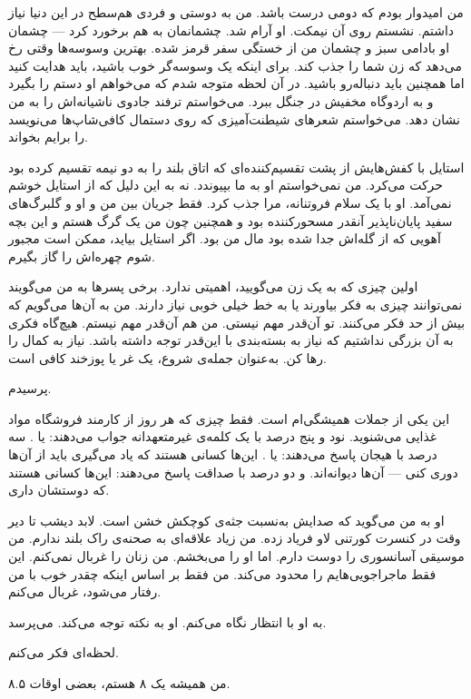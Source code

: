 \begin{flushleft}
من امیدوار بودم که دومی درست باشد. من به دوستی و فردی هم‌سطح در این دنیا نیاز داشتم. نشستم روی آن نیمکت. او آرام شد. چشمانمان به هم برخورد کرد — چشمان او بادامی سبز و چشمان من از خستگی سفر قرمز شده. بهترین وسوسه‌ها وقتی رخ می‌دهد که زن شما را جذب کند. برای اینکه یک وسوسه‌گر خوب باشید، باید هدایت کنید اما همچنین باید دنباله‌رو باشید. در آن لحظه متوجه شدم که می‌خواهم او دستم را بگیرد و به اردوگاه مخفیش در جنگل ببرد. می‌خواستم ترفند جادوی ناشیانه‌اش را به من نشان دهد. می‌خواستم شعرهای شیطنت‌آمیزی که روی دستمال کافی‌شاپ‌ها می‌نویسد را برایم بخواند.


استایل با کفش‌هایش از پشت تقسیم‌کننده‌ای که اتاق بلند را به دو نیمه تقسیم کرده بود حرکت می‌کرد. من نمی‌خواستم او به ما بپیوندد. نه به این دلیل که از استایل خوشم نمی‌آمد. او با یک سلام فروتنانه،  مرا جذب کرد. فقط جریان بین من و او و گلبرگ‌های سفید پایان‌ناپذیر آنقدر مسحورکننده بود و همچنین چون من یک گرگ هستم و این بچه آهویی که از گله‌اش جدا شده بود مال من بود. اگر استایل بیاید، ممکن است مجبور شوم چهره‌اش را گاز بگیرم.

اولین چیزی که به یک زن می‌گویید، اهمیتی ندارد. برخی پسرها به من می‌گویند نمی‌توانند چیزی به فکر بیاورند یا به خط خیلی خوبی نیاز دارند. من به آن‌ها می‌گویم که بیش از حد فکر می‌کنند. تو آن‌قدر مهم نیستی. من هم آن‌قدر مهم نیستم. هیچ‌گاه فکری به آن بزرگی نداشتیم که نیاز به بسته‌بندی با این‌قدر توجه داشته باشد. نیاز به کمال را رها کن. به‌عنوان جمله‌ی شروع، یک غر یا پوزخند کافی است.

 پرسیدم.

این یکی از جملات همیشگی‌ام است. فقط چیزی که هر روز از کارمند فروشگاه مواد غذایی می‌شنوید. نود و پنج درصد با یک کلمه‌ی غیرمتعهدانه جواب می‌دهند:  یا . سه درصد با هیجان پاسخ می‌دهند:  یا . این‌ها کسانی هستند که یاد می‌گیری باید از آن‌ها دوری کنی — آن‌ها دیوانه‌اند. و دو درصد با صداقت پاسخ می‌دهند:  این‌ها کسانی هستند که دوستشان داری.

او به من می‌گوید که  صدایش به‌نسبت جثه‌ی کوچکش خشن است. لابد دیشب تا دیر وقت در کنسرت کورتنی لاو فریاد زده. من زیاد علاقه‌ای به صحنه‌ی راک بلند ندارم. من موسیقی آسانسوری را دوست دارم. اما او را می‌بخشم. من زنان را غربال نمی‌کنم. این فقط ماجراجویی‌هایم را محدود می‌کند. من فقط بر اساس اینکه چقدر خوب با من رفتار می‌شود، غربال می‌کنم.

به او با انتظار نگاه می‌کنم. او به نکته توجه می‌کند.  می‌پرسد.

لحظه‌ای فکر می‌کنم. 

من همیشه یک ۸ هستم، بعضی اوقات ۸.۵.
\end{flushleft}